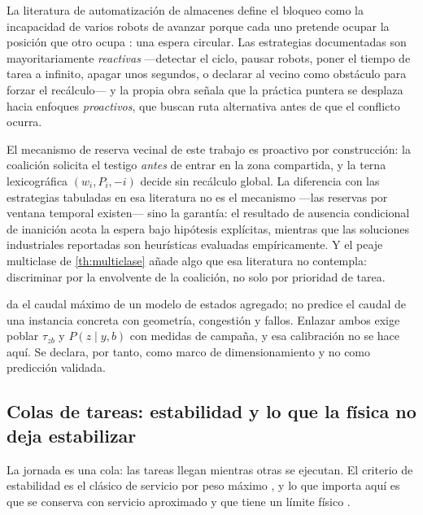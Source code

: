 La literatura de automatización de almacenes define el bloqueo como la
incapacidad de varios robots de avanzar porque cada uno pretende ocupar la
posición que otro ocupa \cite{yildirim2023warehouse}: una espera circular. Las
estrategias documentadas son mayoritariamente \emph{reactivas} —detectar el
ciclo, pausar robots, poner el tiempo de tarea a infinito, apagar unos segundos,
o declarar al vecino como obstáculo para forzar el recálculo— y la propia obra
señala que la práctica puntera se desplaza hacia enfoques \emph{proactivos}, que
buscan ruta alternativa antes de que el conflicto ocurra.

\begin{observacion}
\label{obs:posicionamiento-almacen}
El mecanismo de reserva vecinal de este trabajo es proactivo por construcción: la coalición solicita el
testigo \emph{antes} de entrar en la zona compartida, y la terna lexicográfica
$(w_i,P_i,-i)$ decide sin recálculo global. La diferencia con las estrategias
tabuladas en esa literatura no es el mecanismo —las reservas por ventana
temporal existen— sino la garantía: el resultado de ausencia condicional de
inanición acota la espera bajo hipótesis explícitas, mientras que las soluciones
industriales reportadas son heurísticas evaluadas empíricamente. Y el peaje
multiclase de \cref{th:multiclase} añade algo que esa literatura no contempla:
discriminar por la envolvente de la coalición, no solo por prioridad de tarea.
\end{observacion}

\begin{observacion}
\label{obs:operacion-abierto}
 da el caudal máximo de un modelo de estados agregado; no
predice el caudal de una instancia concreta con geometría, congestión y fallos.
Enlazar ambos exige poblar $\tau_{zb}$ y $P(z\mid y,b)$ con medidas de campaña, y
esa calibración no se hace aquí. Se declara, por tanto, como marco de
dimensionamiento y no como predicción validada.
\end{observacion}

\subsection{Colas de tareas: estabilidad y lo que la física no deja estabilizar}

La jornada es una cola: las tareas llegan mientras otras se ejecutan. El
criterio de estabilidad es el clásico de servicio por peso máximo
\cite{tassiulas1992stability}, y lo que importa aquí es que se conserva con
servicio aproximado y que tiene un límite físico \cite{mayorga2026compendio}.

